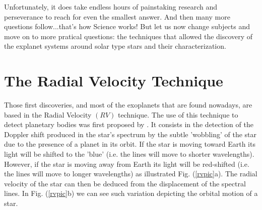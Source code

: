 \documentclass[dvips,12pt,a4paper]{report}
\begin{document}
Unfortunately, it does take endless hours of painstaking research and perseverance to reach for even the smallest answer. And then many more questions follow...that's how Science works! But let us now change subjects and move on to more pratical questions: the techniques that allowed the discovery of the explanet systems around solar type stars and their characterization.


\section{The Radial Velocity Technique}

Those first discoveries, and most of the exoplanets that are found nowadays, are based in the Radial Velocity $(RV)$ technique. The use of this technique to detect planetary bodies was first proposed by \citet{Struve-1952}. It consists in the detection of the Doppler shift produced in the star's spectrum  by the subtle 'wobbling' of the star due to the presence of a planet in its orbit. If the star is moving toward Earth its light will be shifted to the 'blue' (i.e. the lines will move to shorter wavelengths). However, if the star is moving away from Earth its light will be red-shifted (i.e. the lines will move to longer wavelengths) as illustrated Fig. (\ref{rvpic}a). The radial velocity of the star can then be deduced from the displacement of the spectral lines. 
In Fig. (\ref{rvpic}b) we can see such variation depicting the orbital motion of a star. 
\end{document}
